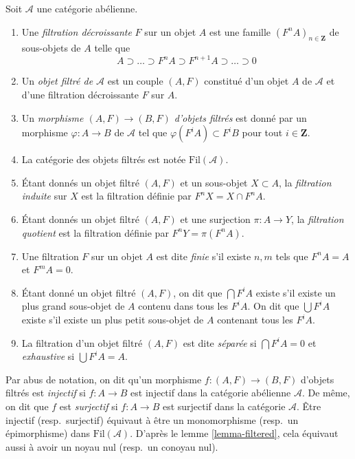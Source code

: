 \begin{definition}
\label{definition-filtered}
Soit $\mathcal{A}$ une catégorie abélienne.
\begin{enumerate}
\item Une {\it filtration décroissante} $F$ sur un objet $A$
est une famille $(F^nA)_{n \in \mathbf{Z}}$ de sous-objets de $A$ telle que
$$
A \supset \ldots \supset F^nA \supset F^{n + 1}A \supset \ldots \supset 0
$$
\item Un {\it objet filtré de $\mathcal{A}$} est
un couple $(A, F)$ constitué d'un objet $A$ de $\mathcal{A}$
et d'une filtration décroissante $F$ sur $A$.
\item Un {\it morphisme $(A, F) \to (B, F)$ d'objets filtrés}
est donné par un morphisme $\varphi : A \to B$ de $\mathcal{A}$
tel que $\varphi(F^iA) \subset F^iB$ pour tout $i \in \mathbf{Z}$.
\item La catégorie des objets filtrés est notée $\text{Fil}(\mathcal{A})$.
\item Étant donnés un objet filtré $(A, F)$ et un sous-objet $X \subset A$, la
{\it filtration induite} sur $X$ est la filtration définie par $F^nX = X \cap F^nA$.
\item Étant donnés un objet filtré $(A, F)$ et une surjection
$\pi : A \to Y$, la {\it filtration quotient} est la filtration définie par
$F^nY = \pi(F^nA)$.
\item Une filtration $F$ sur un objet $A$ est dite {\it finie}
s'il existe $n, m$ tels que $F^nA = A$ et $F^mA = 0$.
\item Étant donné un objet filtré $(A, F)$, on dit que $\bigcap F^iA$ existe
s'il existe un plus grand sous-objet de $A$ contenu dans tous les $F^iA$.
On dit que $\bigcup F^iA$ existe s'il existe un plus petit sous-objet
de $A$ contenant tous les $F^iA$.
\item La filtration d'un objet filtré $(A, F)$ est dite
{\it séparée} si $\bigcap F^iA = 0$ et
{\it exhaustive} si $\bigcup F^iA = A$.
\end{enumerate}
\end{definition}

\noindent
Par abus de notation, on dit qu'un morphisme $f : (A, F) \to (B, F)$
d'objets filtrés est {\it injectif} si $f : A \to B$ est injectif
dans la catégorie abélienne $\mathcal{A}$. De même, on dit que $f$ est
{\it surjectif} si $f : A \to B$ est surjectif dans la catégorie
$\mathcal{A}$. Être injectif (resp.\ surjectif)
équivaut à être un monomorphisme (resp.\ un épimorphisme)
dans $\text{Fil}(\mathcal{A})$. D'après le
lemme \ref{lemma-filtered},
cela équivaut aussi à avoir un noyau nul (resp.\ un conoyau nul).

